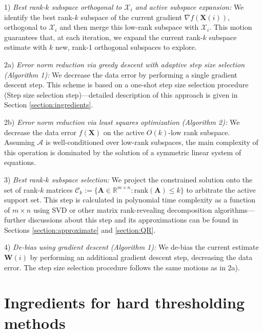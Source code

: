 \documentclass[twocolumn]{svjour3}
\newcommand{\sensing}{\boldsymbol{\mathcal{A}}}
\newcommand{\signal}{\boldsymbol{X}}
\newcommand{\dimension}{m \times n}
\newcommand{\rank}{k}
\begin{document}
\begin{framed}
1) \textit{Best rank-$ \rank $ subspace orthogonal to $ \mathcal{X}_i $ and active subspace expansion:} We identify the best rank-$ \rank $ subspace of the current gradient $ \nabla f(\signal(i)) $, orthogonal to $ \mathcal{X}_i $ and then merge this low-rank subspace with $ \mathcal{X}_i $. This motion guarantees that, at each iteration, we expand the current rank-$ \rank $ subspace estimate with $ \rank $ new, rank-1 orthogonal subspaces to explore. 

2a) \textit{Error norm reduction via greedy descent with adaptive step size selection (Algorithm 1):} We decrease the data error by performing a single gradient descent step. This scheme is based on a one-shot step size selection procedure (Step size selection step)---detailed description of this approach is given in Section \ref{section:ingredients}.

2b) \textit{Error norm reduction via least squares optimization (Algorithm 2):} We decrease the data error $f(\signal)$ on the active $ O(\rank) $-low rank subspace. Assuming $ \sensing $ is well-conditioned over low-rank subspaces, the main complexity of this operation is dominated by the solution of a symmetric linear system of equations. 

3) \textit{Best rank-$ \rank $ subspace selection:} We project the constrained solution onto the set of rank-$\rank$ matrices $ \mathcal{C}_\rank := \lbrace \boldsymbol{A} \in \mathbb{R}^{m \times n}: \text{rank}(\boldsymbol{A}) \leq k \rbrace $ to arbitrate the active support set. 
This step is calculated in polynomial time complexity as a function of $ \dimension $ using SVD or other matrix rank-revealing decomposition algorithms---further discussions about this step and its approximations can be found in Sections \ref{section:approximate} and \ref{section:QR}.

4) \textit{De-bias using gradient descent (Algorithm 1):} We de-bias the current estimate $ \boldsymbol{W}(i) $ by performing an additional gradient descent step, decreasing the data error. The step size selection procedure follows the same motions as in 2a).

\end{framed}

\section{Ingredients for hard thresholding methods}{\label{section:ingredients}}
\end{document}
